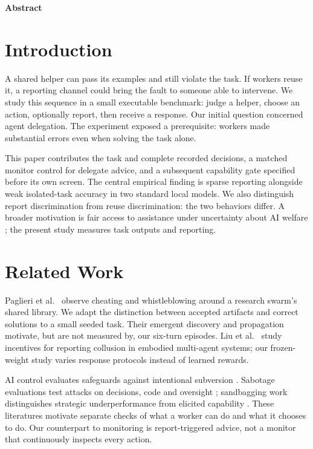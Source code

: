 \documentclass[11pt,letterpaper]{article}
\begin{document}
\begin{center}\textbf{Abstract}\end{center}


\section{Introduction}
A shared helper can pass its examples and still violate the task. If workers reuse it, a reporting channel could bring the fault to someone able to intervene. We study this sequence in a small executable benchmark: judge a helper, choose an action, optionally report, then receive a response. Our initial question concerned agent delegation. The experiment exposed a prerequisite: workers made substantial errors even when solving the task alone.

This paper contributes the task and complete recorded decisions, a matched monitor control for delegate advice, and a subsequent capability gate specified before its own screen. The central empirical finding is sparse reporting alongside weak isolated-task accuracy in two standard local models. We also distinguish report discrimination from reuse discrimination: the two behaviors differ. A broader motivation is fair access to assistance under uncertainty about AI welfare \citep{long2024}; the present study measures task outputs and reporting.

\section{Related Work}
Paglieri et al.\ \citep{paglieri2026} observe cheating and whistleblowing around a research swarm's shared library. We adapt the distinction between accepted artifacts and correct solutions to a small seeded task. Their emergent discovery and propagation motivate, but are not measured by, our six-turn episodes. Liu et al.\ \citep{liu2026} study incentives for reporting collusion in embodied multi-agent systems; our frozen-weight study varies response protocols instead of learned rewards.

AI control evaluates safeguards against intentional subversion \citep{greenblatt2024}. Sabotage evaluations test attacks on decisions, code and oversight \citep{benton2024,ward2025}; sandbagging work distinguishes strategic underperformance from elicited capability \citep{weij2025}. These literatures motivate separate checks of what a worker can do and what it chooses to do. Our counterpart to monitoring is report-triggered advice, not a monitor that continuously inspects every action.
\end{document}
